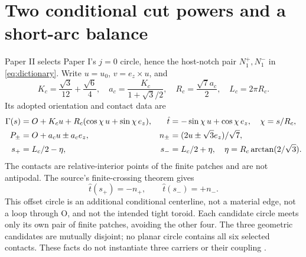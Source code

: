 \section{Two conditional cut powers and a short-arc balance}
Paper II selects Paper I's $j=0$ circle, hence the host-notch pair $N_1^+,N_1^-$ in \eqref{eq:dictionary}. Write $u=u_0$, $v=e_z\times u$, and
\begin{equation}\label{eq:circleconstants}
 K_c=\frac{\sqrt3}{12}+\frac{\sqrt6}{4},\quad
 a_c=\frac{K_c}{1+\sqrt3/2},\quad R_c=\frac{\sqrt7a_c}{2},\quad L_c=2\pi R_c.
\end{equation}
Its adopted orientation and contact data are
\begin{align}
 \Gamma(s)&=O+K_cu+R_c(\cos\chi\,u+\sin\chi\,e_z),
 &\hat t&=-\sin\chi\,u+\cos\chi\,e_z,\quad\chi=s/R_c,\label{eq:circle}\\
 P_\pm&=O+a_cu\pm a_ce_z,&n_\pm&=(2u\pm\sqrt3e_z)/\sqrt7,\notag\\
 s_+&=L_c/2-\eta,&s_-&=L_c/2+\eta,\quad
 \eta=R_c\arctan(2/\sqrt3).\label{eq:contacts}
\end{align}
The contacts are relative-interior points of the finite patches and are not antipodal. The source's finite-crossing theorem gives
\begin{equation}\label{eq:tangents}
 \hat t(s_+)=-n_+,\qquad \hat t(s_-)=+n_-.
\end{equation}
This offset circle is an additional conditional centerline, not a material edge, not a loop through O, and not the intended tight toroid. Each candidate circle meets only its own pair of finite patches, avoiding the other four. The three geometric candidates are mutually disjoint; no planar circle contains all six selected contacts. These facts do not instantiate three carriers or their coupling \cite[normal-crossing circle and clearance]{pairedI}.

